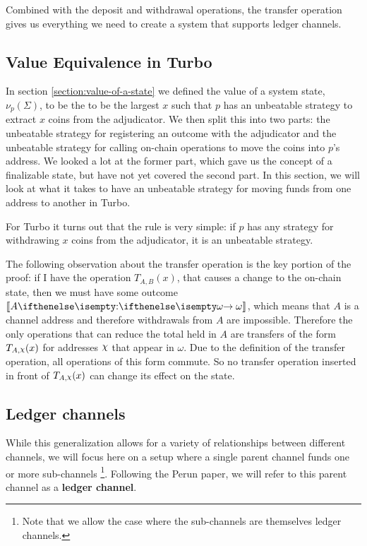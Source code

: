 \documentclass{article}
\begin{document}
Combined with the deposit and withdrawal operations, the transfer operation gives us everything we need to create a system that supports ledger channels.

\subsection{Value Equivalence in Turbo}

In section \ref{section:value-of-a-state} we defined the value of a system state, $\nu_p(\Sigma)$, to be the to be the largest $x$ such that $p$ has an unbeatable strategy to extract $x$ coins from the adjudicator.
We then split this into two parts: the unbeatable strategy for registering an outcome with the adjudicator and the unbeatable strategy for calling on-chain operations to move the coins into $p$'s address.
We looked a lot at the former part, which gave us the concept of a finalizable state,
but have not yet covered the second part.
In this section, we will look at what it takes to have an unbeatable strategy for moving funds from one address to another in Turbo.

For Turbo it turns out that the rule is very simple: if $p$ has any strategy for withdrawing $x$ coins from the adjudicator, it is an unbeatable strategy.

The following observation about the transfer operation is the key portion of the proof:
if I have the operation $T_{A, B}(x)$, that causes a change to the on-chain state,
then we must have some outcome $\adj{\holds{A}{}{\omega}}$, which means that $A$ is a channel address and therefore withdrawals from $A$ are impossible.
Therefore the only operations that can reduce the total held in $A$ are transfers of the form $T_{A, \rchi}(x)$ for addresses $\rchi$ that appear in $\omega$.
Due to the definition of the transfer operation, all operations of this form commute.
So no transfer operation inserted in front of $T_{A, \rchi}(x)$ can change its effect on the state.

\subsection{Ledger channels}

While this generalization allows for a variety of relationships between different channels,
we will focus here on a setup where a single parent channel funds one or more sub-channels
\footnote{Note that we allow the case where the sub-channels are themselves ledger channels.}.
Following the Perun paper, we will refer to this parent channel as a \textbf{ledger channel}.
\end{document}
